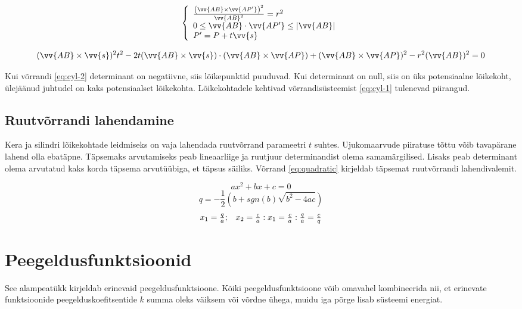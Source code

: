 \documentclass[a4paper,12pt]{report}
\renewcommand{\vec}[1]{\vv{#1}}
\begin{document}
\begin{equation} \label{eq:cyl-1}
\left\{
\begin{array}{l}
\frac{\left(\vec{AB}\times\vec{AP'}\right)^2}{\vec{AB}^2} = r^2 \\
0\leq\vec{AB}\cdot\vec{AP'}\leq|\vec{AB}| \\
P' = P + t\vec s
\end{array}
\right.
\end{equation}

\begin{equation} \label{eq:cyl-2}
(\vec{AB}\times\vec s)^2 t^2 -2t(\vec{AB}\times\vec s)\cdot(\vec{AB}\times\vec{AP}) + (\vec{AB}\times\vec{AP})^2 - r^2(\vec{AB})^2 = 0
\end{equation}

Kui võrrandi \ref{eq:cyl-2} determinant on negatiivne, siis lõikepunktid
puuduvad. Kui determinant on null, siis on üks potensiaalne lõikekoht,
ülejäänud juhtudel on kaks potensiaalset lõikekohta. Lõikekohtadele
kehtivad võrrandisüsteemist \ref{eq:cyl-1} tulenevad piirangud.

\subsection{Ruutvõrrandi lahendamine}
Kera ja silindri lõikekohtade leidmiseks on vaja lahendada ruutvõrrand
parameetri \(t\) suh\-tes. Ujukomaarvude piiratuse tõttu võib tavapärane
lahend olla ebatäpne. Täpsemaks arvutamiseks peab lineaarliige ja ruutjuur
determinandist olema samamärgilised. Lisaks peab determinant olema arvutatud
kaks korda täpsema arvutüübiga, et täpsus säiliks. \cite{FP-quadratic}
Võrrand \ref{eq:quadratic} kirjeldab täpsemat ruutvõrrandi lahendivalemit.

\[ax^2+bx+c=0\]
\[q = -\frac 1 2 \left(b + sgn(b)\sqrt{b^2-4ac}\right)\]
\begin{equation}
\begin{array}{l l} \label{eq:quadratic}
x_1 = \frac q a; & x_2 = \frac c a : x_1 = \frac c a : \frac q a = \frac c q
\end{array}
\end{equation}

\section{Peegeldusfunktsioonid}
See alampeatükk kirjeldab erinevaid peegeldusfunktsioone. Kõiki
peegeldusfunktsioone võib omavahel kombineerida nii, et erinevate funktsioonide
peegelduskoefitsentide \(k\) summa oleks väiksem või võrdne ühega, muidu
iga põrge lisab süsteemi energiat.
\end{document}
